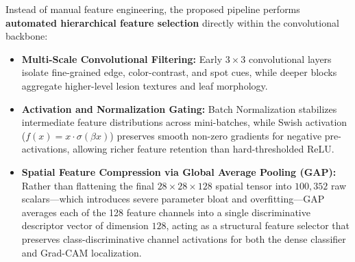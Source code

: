 Instead of manual feature engineering, the proposed pipeline performs \textbf{automated hierarchical feature selection} directly within the convolutional backbone:
\begin{itemize}
    \item \textbf{Multi-Scale Convolutional Filtering:} Early $3 \times 3$ convolutional layers isolate fine-grained edge, color-contrast, and spot cues, while deeper blocks aggregate higher-level lesion textures and leaf morphology.
    \item \textbf{Activation and Normalization Gating:} Batch Normalization \cite{ioffe2015batch} stabilizes intermediate feature distributions across mini-batches, while Swish activation ($f(x) = x \cdot \sigma(\beta x)$) \cite{ramachandran2017swish} preserves smooth non-zero gradients for negative pre-activations, allowing richer feature retention than hard-thresholded ReLU.
    \item \textbf{Spatial Feature Compression via Global Average Pooling (GAP):} Rather than flattening the final $28 \times 28 \times 128$ spatial tensor into $100{,}352$ raw scalars---which introduces severe parameter bloat and overfitting---GAP averages each of the 128 feature channels into a single discriminative descriptor vector of dimension $128$, acting as a structural feature selector that preserves class-discriminative channel activations for both the dense classifier and Grad-CAM localization.
\end{itemize}

